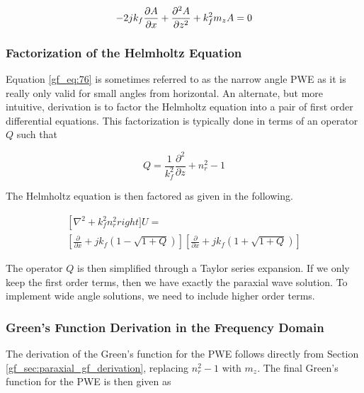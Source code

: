 \begin{equation}
-2jk_f\frac{\partial A}{\partial x} + \frac{\partial^2 A}{\partial z^2} +k_f^2m_zA = 0 \\
\label{gf_eq:76}
\end{equation}
\renewcommand{\baselinestretch}{2} \small\normalsize

\subsubsection{Factorization of the Helmholtz Equation}
Equation \ref{gf_eq:76} is sometimes referred to as the narrow angle PWE as it is really only valid for small angles from horizontal. An alternate, but more intuitive, derivation is to factor the Helmholtz equation into a pair of first order differential equations. This factorization is typically done in terms of an operator $Q$ \cite{kuttler_pe_theory} \cite{dockery_pe} such that

\begin{equation}
Q = \frac{1}{k_f^2}\frac{\partial^2}{\partial z} + n_r^2-1
\label{gf_pwe:1}
\end{equation}
\renewcommand{\baselinestretch}{2} \small\normalsize

The Helmholtz equation is then factored as given in the following.

\begin{equation}
\begin{gathered}
\left[\nabla^2 + k_f^2n_r^2right]U = \\
\left[\frac{\partial}{\partial x}+jk_f\left(1-\sqrt{1+Q} \right) \right]\left[\frac{\partial}{\partial x}+jk_f\left(1+\sqrt{1+Q} \right)\right]
\end{gathered}
\label{gf_pwe:2}
\end{equation}
\renewcommand{\baselinestretch}{2} \small\normalsize

The operator $Q$ is then simplified through a Taylor series expansion. If we only keep the first order terms, then we have exactly the paraxial wave solution. To implement wide angle solutions, we need to include higher order terms.

\subsubsection{Green's Function Derivation in the Frequency Domain}
The derivation of the Green's function for the PWE follows directly from Section \ref{gf_sec:paraxial_gf_derivation}, replacing $n_r^2-1$ with $m_z$. The final Green's function for the PWE is then given as

